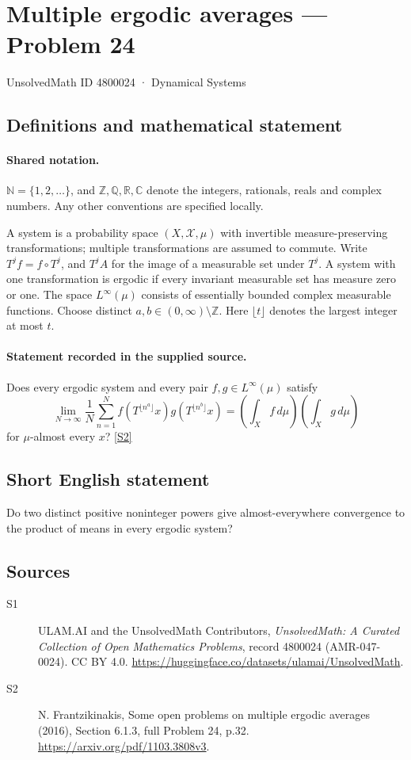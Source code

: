\documentclass[11pt]{article}
\newcommand{\sref}[2]{\hyperlink{source:#1:#2}{[S#2]}}
\begin{document}
\setcounter{section}{4800023}
\section{Multiple ergodic averages — Problem 24}\label{4800024}
{\small\sffamily UnsolvedMath ID 4800024 · Dynamical Systems}
\subsection{Definitions and mathematical statement}

\paragraph{Shared notation.}$\mathbb N=\{1,2,\ldots\}$, and $\mathbb Z,\mathbb Q,\mathbb R,\mathbb C$ denote the integers, rationals, reals and complex numbers. Any other conventions are specified locally.


A system is a probability space $(X,\mathcal X,\mu)$ with invertible measure-preserving transformations; multiple transformations are assumed to commute. Write $T^j f=f\circ T^j$, and $T^j A$ for the image of a measurable set under $T^j$. A system with one transformation is ergodic if every invariant measurable set has measure zero or one. The space $L^\infty(\mu)$ consists of essentially bounded complex measurable functions. Choose distinct $a,b\in(0,\infty)\setminus\mathbb Z$. Here $\lfloor t\rfloor$ denotes the largest integer at most $t$.
\paragraph{Statement recorded in the supplied source.}
Does every ergodic system and every pair $f,g\in L^\infty(\mu)$ satisfy \[\lim_{N\to\infty}\frac1N\sum_{n=1}^N f(T^{\lfloor n^a\rfloor}x)g(T^{\lfloor n^b\rfloor}x)=\left(\int_X f\,d\mu\right)\left(\int_X g\,d\mu\right)\] for $\mu$-almost every $x$? \sref{4800024}{2}
\subsection{Short English statement}
Do two distinct positive noninteger powers give almost-everywhere convergence to the product of means in every ergodic system?
\subsection{Sources}
\begin{description}
\item[\hypertarget{source:4800024:1}{S1}] ULAM.AI and the UnsolvedMath Contributors, \emph{UnsolvedMath: A Curated Collection of Open Mathematics Problems}, record 4800024 (AMR-047-0024). CC BY 4.0. \url{https://huggingface.co/datasets/ulamai/UnsolvedMath}.
\item[\hypertarget{source:4800024:2}{S2}] N. Frantzikinakis, Some open problems on multiple ergodic averages (2016), Section 6.1.3, full Problem 24, p.32. \url{https://arxiv.org/pdf/1103.3808v3}.
\end{description}
\label{end:4800024}
\end{document}
